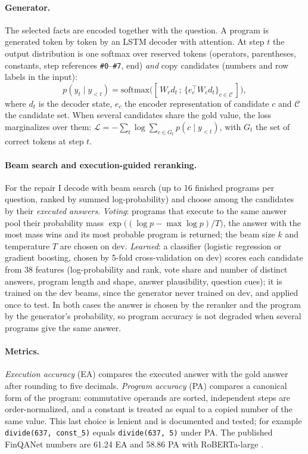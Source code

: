 \documentclass{article}
\newcommand{\code}[1]{\texttt{#1}}
\begin{document}
\paragraph{Generator.} The selected facts are encoded together with the question. A program is generated token by token by an LSTM decoder with attention. At step $t$ the output distribution is one softmax over reserved tokens (operators, parentheses, constants, step references \code{\#0}--\code{\#7}, end) \emph{and} copy candidates (numbers and row labels in the input):
\begin{equation}
p(y_t \mid y_{<t}) = \mathrm{softmax}\big([\,W_r d_t \,;\, \{ e_c^\top W_c d_t \}_{c\in\mathcal{C}}\,]\big),
\end{equation}
where $d_t$ is the decoder state, $e_c$ the encoder representation of candidate $c$ and $\mathcal{C}$ the candidate set. When several candidates share the gold value, the loss marginalizes over them: $\mathcal{L}=-\sum_t \log \sum_{c\in G_t} p(c\mid y_{<t})$, with $G_t$ the set of correct tokens at step $t$.

\paragraph{Beam search and execution-guided reranking.} For the repair I decode with beam search (up to 16 finished programs per question, ranked by summed log-probability) and choose among the candidates by their \emph{executed answers}. \emph{Voting}: programs that execute to the same answer pool their probability mass $\exp\big((\log p-\max\log p)/T\big)$, the answer with the most mass wins and its most probable program is returned; the beam size $k$ and temperature $T$ are chosen on dev. \emph{Learned}: a classifier (logistic regression or gradient boosting, chosen by 5-fold cross-validation on dev) scores each candidate from 38 features (log-probability and rank, vote share and number of distinct answers, program length and shape, answer plausibility, question cues); it is trained on the dev beams, since the generator never trained on dev, and applied once to test. In both cases the answer is chosen by the reranker and the program by the generator's probability, so program accuracy is not degraded when several programs give the same answer.

\paragraph{Metrics.} \emph{Execution accuracy} (EA) compares the executed answer with the gold answer after rounding to five decimals. \emph{Program accuracy} (PA) compares a canonical form of the program: commutative operands are sorted, independent steps are order-normalized, and a constant is treated as equal to a copied number of the same value. This last choice is lenient and is documented and tested; for example \code{divide(637, const\_5)} equals \code{divide(637, 5)} under PA. The published FinQANet numbers are 61.24 EA and 58.86 PA with RoBERTa-large \citep{chen2021finqa}.
\end{document}
